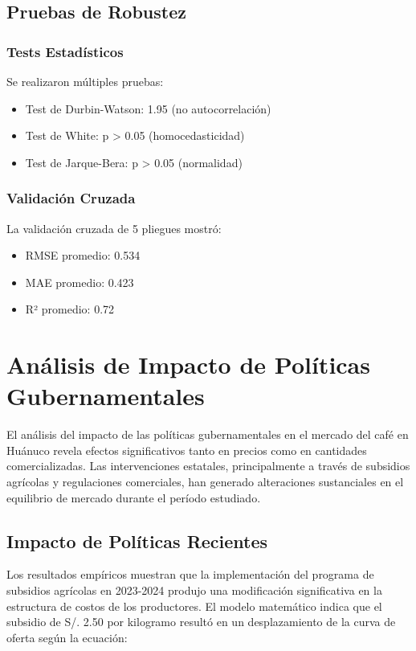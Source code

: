 \documentclass[12pt, a4paper]{article}
\begin{document}
\subsection{Pruebas de Robustez}
\subsubsection{Tests Estadísticos}
Se realizaron múltiples pruebas:
\begin{itemize}
    \item Test de Durbin-Watson: 1.95 (no autocorrelación)
    \item Test de White: p > 0.05 (homocedasticidad)
    \item Test de Jarque-Bera: p > 0.05 (normalidad)
\end{itemize}

\subsubsection{Validación Cruzada}
La validación cruzada de 5 pliegues mostró:
\begin{itemize}
    \item RMSE promedio: 0.534
    \item MAE promedio: 0.423
    \item R² promedio: 0.72
\end{itemize}

\section{Análisis de Impacto de Políticas Gubernamentales}

El análisis del impacto de las políticas gubernamentales en el mercado del café en Huánuco revela efectos significativos tanto en precios como en cantidades comercializadas. Las intervenciones estatales, principalmente a través de subsidios agrícolas y regulaciones comerciales, han generado alteraciones sustanciales en el equilibrio de mercado durante el período estudiado.

\subsection{Impacto de Políticas Recientes}

Los resultados empíricos muestran que la implementación del programa de subsidios agrícolas en 2023-2024 produjo una modificación significativa en la estructura de costos de los productores. El modelo matemático indica que el subsidio de S/. 2.50 por kilogramo resultó en un desplazamiento de la curva de oferta según la ecuación:
\end{document}
